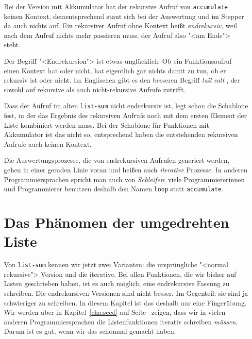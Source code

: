 Bei der Version mit Akkumulator hat der rekursive Aufruf von
\lstinline{accumulate} keinen Kontext, dementsprechend staut sich bei
der Auswertung und im Stepper da auch nichts auf.  Ein rekursiver
Aufruf ohne Kontext heißt \textit{endrekursiv},
weil nach dem Aufruf nichts mehr passieren muss, der Aufruf also "<am
Ende"> steht.

Der Begriff "<Endrekursion"> ist etwas unglücklich: Ob ein
Funktionsaufruf einen Kontext hat oder nicht, hat eigentlich gar
nichts damit zu tun, ob er rekursiv ist oder nicht.  Im Englischen
gibt es den besseren Begriff \textit{tail call}
, der sowohl auf rekursive
als auch nicht-rekursive Aufrufe zutrifft.

Dass der Aufruf im alten \lstinline{list-sum} nicht endrekursiv ist,
legt schon die Schablone fest, in der das Ergebnis des rekursiven
Aufrufs noch mit dem ersten Element der Liste kombiniert werden muss.
Bei der Schablone für Funktionen mit Akkumulator ist das nicht so,
entsprechend haben die entstehenden rekursiven Aufrufe auch keinen
Kontext.

Die Auswertungsprozesse, die von endrekursiven Aufrufen generiert
werden, gehen in einer geraden Linie voran und heißen auch
\textit{iterative} Prozesse.  In anderen
Programmiersprachen spricht man auch von
\textit{Schleifen}; viele Programmiererinnen und
Programmierer benutzen deshalb den Namen \lstinline{loop} statt
\lstinline{accumulate}.

\section{Das Phänomen der umgedrehten Liste}

Von \lstinline{list-sum} kennen wir jetzt zwei Varianten: die
ursprüngliche "<normal rekursive"> Version und die iterative.  Bei
allen Funktionen, die wir bisher auf Listen geschrieben haben, ist es
auch möglich, eine endrekursive Fassung zu schreiben.  Die
endrekursiven Versionen sind nicht besser.  Im Gegenteil: sie sind ja
schwieriger zu schreiben.  In diesem Kapitel ist das deshalb nur eine
Fingerübung.  Wir werden aber in Kapitel~\ref{cha:secd} auf
Seite~\pageref{cha:secd} zeigen, dass wir in vielen anderen
Programmiersprachen die Listenfunktionen iterativ schreiben
\emph{müssen}.  Darum ist es gut, wenn wir das schonmal gemacht haben.


